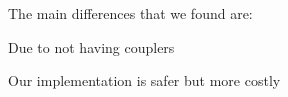 The main differences that we found are:

{}
Due to not having couplers

{}
Our implementation is safer but more costly
